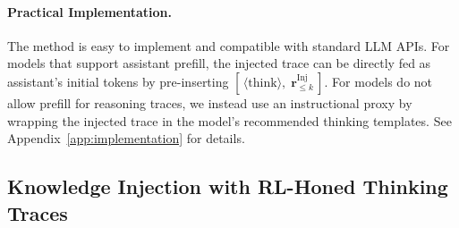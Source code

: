 \documentclass[twoside]{article}
\begin{document}
\paragraph{Practical Implementation.}
The method is easy to implement and compatible with standard LLM APIs. For models that support assistant prefill, the injected trace can be directly fed as assistant's initial tokens by pre-inserting
\(
[\,\langle\mathrm{think}\rangle,\;\mathbf{r}^{\text{Inj}}_{\le k}\,]
\). For models do not allow prefill for reasoning traces, we instead use an instructional proxy by wrapping the injected trace in the model’s recommended thinking templates. See Appendix~\ref{app:implementation} for details.


\begin{algorithm}[!t]
\caption{Algorithm Workflow for Knowledge Injection with RL Honed Thinking}
\label{alg:ki-rl}

\BlankLine
{}

\BlankLine
{}
\end{algorithm}

\subsection{Knowledge Injection with RL-Honed Thinking Traces}
\label{method:rl}
\end{document}
